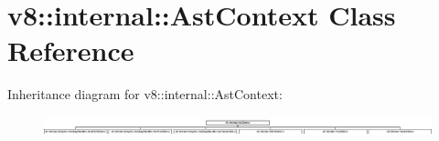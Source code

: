 \hypertarget{classv8_1_1internal_1_1_ast_context}{}\section{v8\+:\+:internal\+:\+:Ast\+Context Class Reference}
\label{classv8_1_1internal_1_1_ast_context}
Inheritance diagram for v8\+:\+:internal\+:\+:Ast\+Context\+:\begin{figure}[H]
\begin{center}
\leavevmode
\includegraphics[height=0.558882cm]{classv8_1_1internal_1_1_ast_context}
\end{center}
\end{figure}
